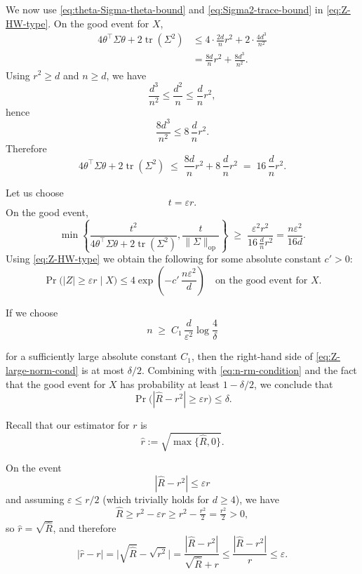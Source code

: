 We now use \eqref{eq:theta-Sigma-theta-bound} and \eqref{eq:Sigma2-trace-bound} in
\eqref{eq:Z-HW-type}.
On the good event for $X$,
\begin{align*}
4\theta^\top\Sigma\theta + 2\operatorname{tr}(\Sigma^2)
&\le 4 \cdot \frac{2d}{n}r^2 + 2\cdot\frac{4d^3}{n^2} \\
&= \frac{8d}{n}r^2 + \frac{8d^3}{n^2}.
\end{align*}
Using $r^2\ge d$ and $n\ge d$, we have
\[
\frac{d^3}{n^2} \le \frac{d^2}{n} \le \frac{d}{n}r^2,
\]
hence
\[
\frac{8d^3}{n^2} \le 8\,\frac{d}{n}r^2.
\]
Therefore
\begin{equation}
4\theta^\top\Sigma\theta + 2\operatorname{tr}(\Sigma^2)
\;\le\; \frac{8d}{n}r^2 + 8\,\frac{d}{n}r^2
\;=\; 16\,\frac{d}{n}r^2.
\label{eq:denominator-bound}
\end{equation}

Let us choose
\[
t = \varepsilon r.
\]
On the good event,
\[
\min\left\{\frac{t^2}{4\theta^\top\Sigma\theta + 2\operatorname{tr}(\Sigma^2)},\frac{t}{\|\Sigma\|_{\mathrm{op}}}\right\}
\;\ge\;
\frac{\varepsilon^2 r^2}{16\,\frac{d}{n}r^2}
= \frac{n\varepsilon^2}{16d}.
\]
Using \eqref{eq:Z-HW-type} we obtain the following for some absolute constant $c'>0$:
\begin{equation}
\Pr\big(|Z|\ge \varepsilon r \mid X\big)
\le 4\exp\left(-c'\,\frac{n\varepsilon^2}{d}\right)
\quad\text{on the good event for }X.
\label{eq:Z-large-norm-cond}
\end{equation}

If we choose
\[
n \;\ge\; C_1\,\frac{d}{\varepsilon^2}\log\frac{4}{\delta}
\]

for a sufficiently large absolute constant $C_1$, then the right-hand side of
\eqref{eq:Z-large-norm-cond} is at most $\delta/2$.
Combining with \eqref{eq:n-rm-condition} and the fact that the good event for $X$
has probability at least $1-\delta/2$, we conclude that
\begin{equation}
\Pr\big(|\widehat{R} - r^2| \ge \varepsilon r\big) \le \delta.
\label{eq:r2-hat-concentration}
\end{equation}

Recall that our estimator for $r$ is
\begin{equation}
\hat r := \sqrt{\max\{\widehat{R},0\}}.
\label{eq:r-hat-def}
\end{equation}

On the event
\[
|\widehat{R} - r^2| \le \varepsilon r
\]
and assuming $\varepsilon \le r/2$ (which trivially holds for $d\geq 4$), we have
\[
\widehat{R} \ge r^2 - \varepsilon r \ge r^2 - \tfrac{r^2}{2} = \tfrac{r^2}{2} > 0,
\]
so $\hat r = \sqrt{\widehat{R}}$, and therefore
\[
|\hat r - r|
= \big|\sqrt{\widehat{R}} - \sqrt{r^2}\big|
= \frac{|\widehat{R} - r^2|}{\sqrt{\widehat{R}} + r}
\le \frac{|\widehat{R} - r^2|}{r}
\le \varepsilon.
\]

